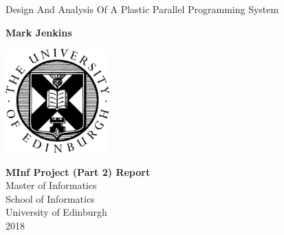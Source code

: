 \documentclass{report}
\begin{document}
\begin{titlepage}
    \begin{center}
        \vspace*{3cm}
        
        \Huge
        Design And Analysis Of A Plastic Parallel Programming System
        
        \vspace{1.5cm}
        
        \large
        \textbf{Mark Jenkins}
        
        \vspace{2.5cm}

        \includegraphics[width=0.3\textwidth]{university}

        \vspace{2.5cm}
        
        \textbf{MInf Project (Part 2) Report}\\
        Master of Informatics\\
        School of Informatics\\
        University of Edinburgh\\
        2018
    \end{center}
\end{titlepage}

\setlength\parskip{1em}
\setlength\parindent{0pt}
\end{document}
